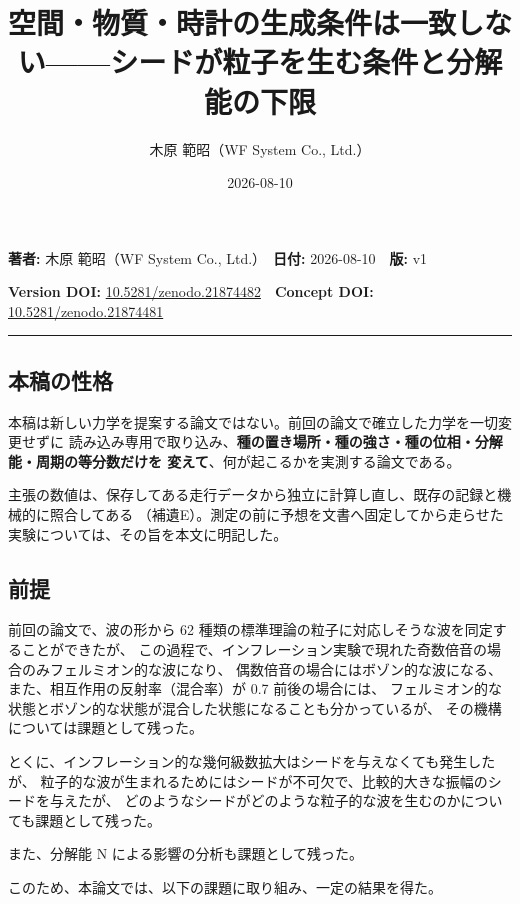 \documentclass[
]{ltjsarticle}
\title{空間・物質・時計の生成条件は一致しない------シードが粒子を生む条件と分解能の下限}
\author{木原 範昭（WF System Co., Ltd.）}
\date{2026-08-10}
\begin{document}
\maketitle

\textbf{著者:} 木原 範昭（WF System Co., Ltd.）　\textbf{日付:}
2026-08-10　\textbf{版:} v1

\textbf{Version DOI:}
\href{https://doi.org/10.5281/zenodo.21874482}{10.5281/zenodo.21874482}　\textbf{Concept
DOI:}
\href{https://doi.org/10.5281/zenodo.21874481}{10.5281/zenodo.21874481}

\begin{center}\rule{0.5\linewidth}{0.5pt}\end{center}

\subsection{本稿の性格}\label{ux672cux7a3fux306eux6027ux683c}

本稿は新しい力学を提案する論文ではない。前回の論文で確立した力学を一切変更せずに
読み込み専用で取り込み、\textbf{種の置き場所・種の強さ・種の位相・分解能・周期の等分数だけを
変えて}、何が起こるかを実測する論文である。

主張の数値は、保存してある走行データから独立に計算し直し、既存の記録と機械的に照合してある
（補遺E）。測定の前に予想を文書へ固定してから走らせた実験については、その旨を本文に明記した。

\subsection{前提}\label{ux524dux63d0}

前回の論文で、波の形から 62
種類の標準理論の粒子に対応しそうな波を同定することができたが、
この過程で、インフレーション実験で現れた奇数倍音の場合のみフェルミオン的な波になり、
偶数倍音の場合にはボゾン的な波になる、また、相互作用の反射率（混合率）が
0.7 前後の場合には、
フェルミオン的な状態とボゾン的な状態が混合した状態になることも分かっているが、
その機構については課題として残った。

とくに、インフレーション的な幾何級数拡大はシードを与えなくても発生したが、
粒子的な波が生まれるためにはシードが不可欠で、比較的大きな振幅のシードを与えたが、
どのようなシードがどのような粒子的な波を生むのかについても課題として残った。

また、分解能 N による影響の分析も課題として残った。

このため、本論文では、以下の課題に取り組み、一定の結果を得た。
\end{document}
